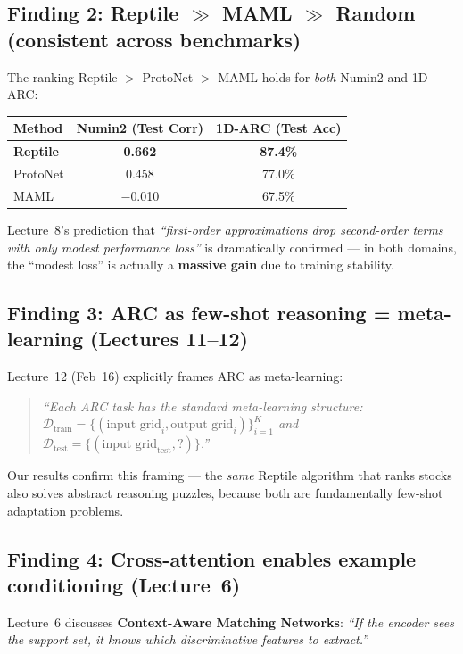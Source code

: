 \documentclass[11pt,a4paper]{article}
\begin{document}
\subsection{Finding 2: Reptile $\gg$ MAML $\gg$ Random (consistent across benchmarks)}

The ranking Reptile $>$ ProtoNet $>$ MAML holds for \emph{both} Numin2 and 1D-ARC:

\begin{center}
\begin{tabular}{lcc}
\toprule
\textbf{Method} & \textbf{Numin2 (Test Corr)} & \textbf{1D-ARC (Test Acc)} \\
\midrule
\textbf{Reptile} & \textbf{0.662} & \textbf{87.4\%} \\
ProtoNet & 0.458 & 77.0\% \\
MAML & $-$0.010 & 67.5\% \\
\bottomrule
\end{tabular}
\end{center}

Lecture~8's prediction that \emph{``first-order approximations drop second-order terms with only modest performance loss''} is dramatically confirmed --- in both domains, the ``modest loss'' is actually a \textbf{massive gain} due to training stability.

\subsection{Finding 3: ARC as few-shot reasoning = meta-learning (Lectures 11--12)}

Lecture~12 (Feb~16) explicitly frames ARC as meta-learning:
\begin{quote}
\emph{``Each ARC task has the standard meta-learning structure: $\mathcal{D}_{\text{train}} = \{(\text{input grid}_i, \text{output grid}_i)\}_{i=1}^K$ and $\mathcal{D}_{\text{test}} = \{(\text{input grid}_{\text{test}}, ?)\}$.''}
\end{quote}

Our results confirm this framing --- the \emph{same} Reptile algorithm that ranks stocks also solves abstract reasoning puzzles, because both are fundamentally few-shot adaptation problems.

\subsection{Finding 4: Cross-attention enables example conditioning (Lecture~6)}

Lecture~6 discusses \textbf{Context-Aware Matching Networks}: \emph{``If the encoder sees the support set, it knows which discriminative features to extract.''}
\end{document}
